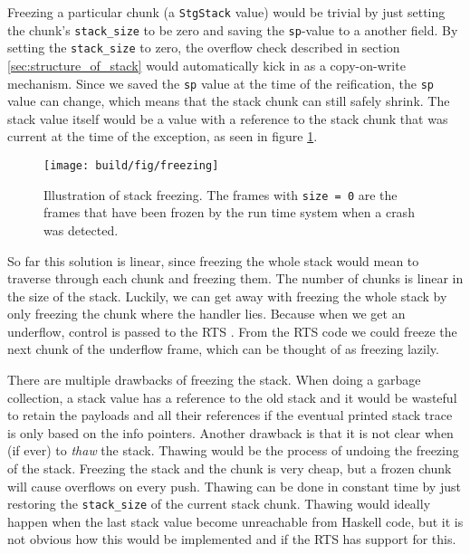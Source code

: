 Freezing a particular chunk (a \texttt{StgStack} value) would be
trivial by just setting the chunk's \texttt{stack\_size} to be zero
and saving the \texttt{sp}-value to a another field. By setting
the \texttt{stack\_size} to zero, the overflow check described in
section \ref{sec:structure_of_stack} would automatically kick in as a
copy-on-write mechanism. Since we saved the \texttt{sp} value at the time of the reification,
the \texttt{sp} value can change, which means that the stack chunk
can still safely shrink. The stack value itself would be a value with
a reference to the stack chunk that was current at the time of the
exception, as seen in figure \ref{fig:freezing}.

\begin{figure}
\begin{mdframed}
  \texttt{[image: build/fig/freezing]}
  \caption{Illustration of stack freezing. The frames with \texttt{size = 0}
    are the frames that have been frozen by the run time system when a crash
    was detected.}
  \label{fig:freezing}
\end{mdframed}
\end{figure}

So far this solution is linear, since freezing the whole stack would mean
to traverse through each chunk and freezing them. The number of chunks is
linear in the size of the stack. Luckily, we can get away with freezing
the whole stack by only freezing the chunk where the handler lies.
Because when we get an underflow, control is passed to the RTS
\cite{github_underflow_frame}. From the RTS code we could freeze
the next chunk of the underflow frame, which can be thought of as freezing lazily.

There are multiple drawbacks of freezing the stack. When doing a garbage
collection, a stack value has a reference to the old stack and it would
be wasteful to retain the payloads and all their references if the
eventual printed stack trace is only based on the info pointers. Another
drawback is that it is not clear when (if ever) to \emph{thaw} the
stack. Thawing would be the process of undoing the freezing of the
stack. Freezing the stack and the chunk is very cheap, but a frozen chunk
will cause overflows on every push. Thawing can be done in
constant time by just restoring the \texttt{stack\_size} of the current
stack chunk. Thawing would ideally happen when the last stack value
become unreachable from Haskell code, but it is not obvious how this
would be implemented and if the RTS has support for this.

